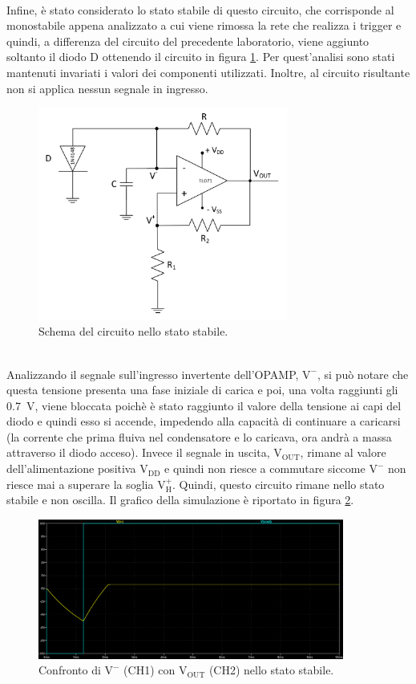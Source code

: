 \documentclass{report}
\begin{document}
\\Infine, è stato considerato lo stato stabile di questo circuito, che corrisponde al monostabile appena analizzato a cui viene rimossa la rete che realizza i trigger e quindi, a differenza del circuito del precedente laboratorio, viene aggiunto soltanto il diodo D ottenendo il circuito in figura \ref{figura:schema1stabile}. Per quest'analisi sono stati mantenuti invariati i valori dei componenti utilizzati. Inoltre, al circuito risultante non si applica nessun segnale in ingresso.
\begin{figure}[h!]
	\centering
	\includegraphics[height=7cm]{immagini/schema1stabile}
	\caption{Schema del circuito nello stato stabile.}
	\label{figura:schema1stabile}
\end{figure}
\\Analizzando il segnale sull'ingresso invertente dell'OPAMP, $\mathrm{V^-}$, si può notare che questa tensione presenta una fase iniziale di carica e poi, una volta raggiunti gli \SI{0.7}{\volt}, viene bloccata poichè è stato raggiunto il valore della tensione ai capi del diodo e quindi esso si accende, impedendo alla capacità di continuare a caricarsi (la corrente che prima fluiva nel condensatore e lo caricava, ora andrà a massa attraverso il diodo acceso). Invece il segnale in uscita, $\mathrm{V_{OUT}}$, rimane al valore dell'alimentazione positiva $\mathrm{V_{DD}}$ e quindi non riesce a commutare siccome $\mathrm{V^-}$ non riesce mai a superare la soglia $\mathrm{V_H^+}$. Quindi, questo circuito rimane nello stato stabile e  non oscilla. Il grafico della simulazione è riportato in figura \ref{figura:simulazione1}. 
\begin{figure}[h!]
	\centering
	\includegraphics[height=4.6cm]{immagini/plot_sim_stabile}
	\caption{Confronto di $\mathrm{V^-}$ (CH1) con $\mathrm{V_{OUT}}$ (CH2) nello stato stabile.}
	\label{figura:simulazione1}
\end{figure}
\end{document}

